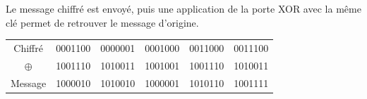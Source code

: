 \documentclass[svgnames,11pt]{beamer}
\begin{document}
\begin{frame}
    \frametitle{}
    \begin{aretenir}[Remarque]
        Le message chiffré est envoyé, puis une application de la porte XOR avec la même clé permet de retrouver le message d'origine.
        \end{aretenir}
    \begin{center}
        \begin{tabular}{*{6}{c}}
            Chiffré&0001100&0000001&0001000&0011000&0011100\\
            
            $\oplus$&1001110&1010011&1001001&1001110&1010011\\
            \hline
            Message&1000010&1010010&1000001&1010110&1001111\\
        \end{tabular}
    \end{center}

\end{frame}
\end{document}
